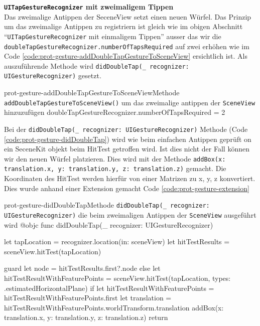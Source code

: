 \begin{description}
    \textbf{\texttt{UITapGestureRecognizer} mit zweimaligem Tippen}\\

    Das zweimalige Antippen der SeceneView setzt einen neuen Würfel. Das Prinzip um das zweimalige Antippen zu registriern ist gleich wie im obigen Abschnitt "`\texttt{UITapGestureRecognizer} mit einmaligem Tippen"' ausser das wir die \texttt{doubleTapGestureRecognizer.numberOfTapsRequired} auf zwei erhöhen wie im Code \ref{code:prot-gesture-addDoubleTapGestureToSceneView} ersichtlich ist. Als auszuführende Methode wird \texttt{didDoubleTap(\_ recognizer: UIGestureRecognizer)} gesetzt.

    \begin{code}{prot-gesture-addDoubleTapGestureToSceneView}{Methode \texttt{addDoubleTapGestureToSceneView()} um das zweimalige antippen der \texttt{SceneView} hinzuzufügen}
    doubleTapGestureRecognizer.numberOfTapsRequired = 2
    \end{code}

    Bei der \texttt{didDoubleTap(\_ recognizer: UIGestureRecognizer)} Methode (Code \ref{code:prot-gesture-didDoubleTap}) wird wie beim einfachen Antippen geprüft on ein SeceneKit objekt beim HitTest getroffen wird. Ist dies nicht der Fall können wir den neuen Würfel platzieren. Dies wird mit der Methode \texttt{addBox(x: translation.x, y: translation.y, z: translation.z)} gemacht. Die Koordinaten des HitTest werden hierfür von einer Matrizen zu x, y, z konvertiert. Dies wurde anhand einer Extension gemacht Code \ref{code:prot-gesture-extension}

    \begin{code}{prot-gesture-didDoubleTap}{Methode \texttt{didDoubleTap(\_ recognizer: UIGestureRecognizer)} die beim zweimaligen Antippen der \texttt{SceneView} ausgeführt wird}
    @objc
    func didDoubleTap(_ recognizer: UIGestureRecognizer) {
        let tapLocation = recognizer.location(in: sceneView)
        let hitTestResults = sceneView.hitTest(tapLocation)
        
        guard let node = hitTestResults.first?.node else {
            let hitTestResultWithFeaturePoints = sceneView.hitTest(tapLocation, types: .estimatedHorizontalPlane)
            if let hitTestResultWithFeaturePoints = hitTestResultWithFeaturePoints.first {
                let translation = hitTestResultWithFeaturePoints.worldTransform.translation
                addBox(x: translation.x, y: translation.y, z: translation.z)
            }
            return
        }
    }
    \end{code}


\end{description}
